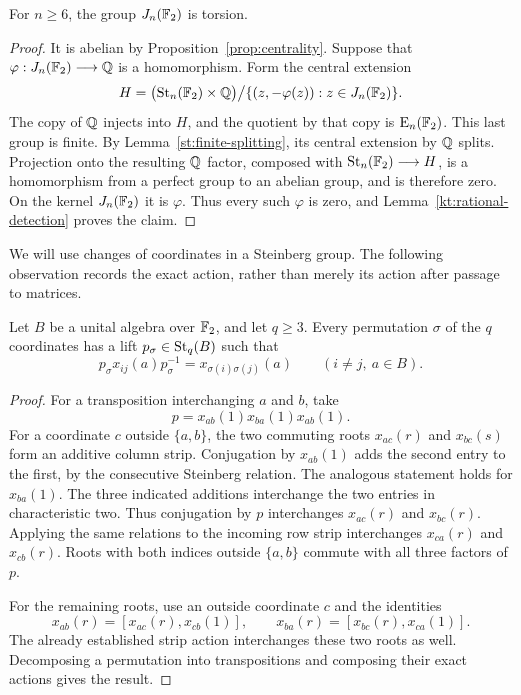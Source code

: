 \begin{lemma}\label{kt:field-kernel}
For $n\geq 6$, the group $J_n(\mathbb F_2)$ is torsion.
\end{lemma}

\begin{proof}
It is abelian by Proposition~\ref{prop:centrality}.  Suppose that
$\varphi:J_n(\mathbb F_2)\longrightarrow\mathbb Q$ is a homomorphism.  Form the
central extension
\[
 H=\bigl(\operatorname{St}_n(\mathbb F_2)\times\mathbb Q\bigr)
   \big/\{(z,-\varphi(z)):z\in J_n(\mathbb F_2)\}.
\]
The copy of $\mathbb Q$ injects into $H$, and the quotient by that copy is
$\operatorname{E}_n(\mathbb F_2)$.  This last group is finite.  By
Lemma~\ref{st:finite-splitting}, its central extension by $\mathbb Q$ splits.
Projection onto the resulting $\mathbb Q$ factor, composed with
$\operatorname{St}_n(\mathbb F_2)\longrightarrow H$, is a homomorphism from a perfect
group to an abelian group, and is therefore zero.  On the kernel
$J_n(\mathbb F_2)$ it is $\varphi$.  Thus every such $\varphi$ is zero,
and Lemma~\ref{kt:rational-detection} proves the claim.
\end{proof}

We will use changes of coordinates in a Steinberg group.  The following
observation records the exact action, rather than merely its action
after passage to matrices.

\begin{lemma}\label{kt:permutations}
Let $B$ be a unital algebra over $\mathbb F_2$, and let $q\geq 3$.
Every permutation $\sigma$ of the $q$ coordinates has a lift
$p_\sigma\in\operatorname{St}_q(B)$ such that
\[
 p_\sigma x_{ij}(a)p_\sigma^{-1}
   =x_{\sigma(i)\sigma(j)}(a)
 \qquad(i\ne j,\ a\in B).
\]
\end{lemma}

\begin{proof}
For a transposition interchanging $a$ and $b$, take
\[
 p=x_{ab}(1)x_{ba}(1)x_{ab}(1).
\]
For a coordinate $c$ outside $\{a,b\}$, the two commuting roots
$x_{ac}(r)$ and $x_{bc}(s)$ form an additive column strip.  Conjugation
by $x_{ab}(1)$ adds the second entry to the first, by the consecutive
Steinberg relation.  The analogous statement holds for
$x_{ba}(1)$.  The three indicated additions interchange the two
entries in characteristic two.  Thus conjugation by $p$ interchanges
$x_{ac}(r)$ and $x_{bc}(r)$.  Applying the same relations to the
incoming row strip interchanges $x_{ca}(r)$ and $x_{cb}(r)$.
Roots with both indices outside $\{a,b\}$ commute with all three
factors of $p$.

For the remaining roots, use an outside coordinate $c$ and the
identities
\[
 x_{ab}(r)=[x_{ac}(r),x_{cb}(1)],\qquad
 x_{ba}(r)=[x_{bc}(r),x_{ca}(1)].
\]
The already established strip action interchanges these two roots
as well.  Decomposing a permutation into transpositions and composing
their exact actions gives the result.
\end{proof}


